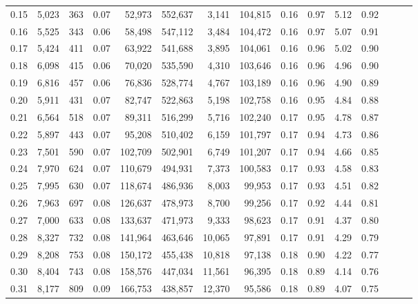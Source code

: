 \begin{tabular}{rrrrrrrrrrrrrrr}
0.15 &   5,023 &    363 &  0.07 &   52,973 &  552,637 &    3,141 &  104,815 &  0.16 &  0.97 &  5.12 &      0.92 \\
0.16 &   5,525 &    343 &  0.06 &   58,498 &  547,112 &    3,484 &  104,472 &  0.16 &  0.97 &  5.07 &      0.91 \\
0.17 &   5,424 &    411 &  0.07 &   63,922 &  541,688 &    3,895 &  104,061 &  0.16 &  0.96 &  5.02 &      0.90 \\
0.18 &   6,098 &    415 &  0.06 &   70,020 &  535,590 &    4,310 &  103,646 &  0.16 &  0.96 &  4.96 &      0.90 \\
0.19 &   6,816 &    457 &  0.06 &   76,836 &  528,774 &    4,767 &  103,189 &  0.16 &  0.96 &  4.90 &      0.89 \\
0.20 &   5,911 &    431 &  0.07 &   82,747 &  522,863 &    5,198 &  102,758 &  0.16 &  0.95 &  4.84 &      0.88 \\
0.21 &   6,564 &    518 &  0.07 &   89,311 &  516,299 &    5,716 &  102,240 &  0.17 &  0.95 &  4.78 &      0.87 \\
0.22 &   5,897 &    443 &  0.07 &   95,208 &  510,402 &    6,159 &  101,797 &  0.17 &  0.94 &  4.73 &      0.86 \\
0.23 &   7,501 &    590 &  0.07 &  102,709 &  502,901 &    6,749 &  101,207 &  0.17 &  0.94 &  4.66 &      0.85 \\
0.24 &   7,970 &    624 &  0.07 &  110,679 &  494,931 &    7,373 &  100,583 &  0.17 &  0.93 &  4.58 &      0.83 \\
0.25 &   7,995 &    630 &  0.07 &  118,674 &  486,936 &    8,003 &   99,953 &  0.17 &  0.93 &  4.51 &      0.82 \\
0.26 &   7,963 &    697 &  0.08 &  126,637 &  478,973 &    8,700 &   99,256 &  0.17 &  0.92 &  4.44 &      0.81 \\
0.27 &   7,000 &    633 &  0.08 &  133,637 &  471,973 &    9,333 &   98,623 &  0.17 &  0.91 &  4.37 &      0.80 \\
0.28 &   8,327 &    732 &  0.08 &  141,964 &  463,646 &   10,065 &   97,891 &  0.17 &  0.91 &  4.29 &      0.79 \\
0.29 &   8,208 &    753 &  0.08 &  150,172 &  455,438 &   10,818 &   97,138 &  0.18 &  0.90 &  4.22 &      0.77 \\
0.30 &   8,404 &    743 &  0.08 &  158,576 &  447,034 &   11,561 &   96,395 &  0.18 &  0.89 &  4.14 &      0.76 \\
0.31 &   8,177 &    809 &  0.09 &  166,753 &  438,857 &   12,370 &   95,586 &  0.18 &  0.89 &  4.07 &      0.75 \\

\end{tabular}

